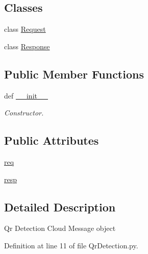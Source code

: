 \subsection*{Classes}
\begin{DoxyCompactItemize}
\item 
class \hyperlink{classRappCloud_1_1CloudMsgs_1_1QrDetection_1_1QrDetection_1_1Request}{Request}
\item 
class \hyperlink{classRappCloud_1_1CloudMsgs_1_1QrDetection_1_1QrDetection_1_1Response}{Response}
\end{DoxyCompactItemize}
\subsection*{Public Member Functions}
\begin{DoxyCompactItemize}
\item 
def \hyperlink{classRappCloud_1_1CloudMsgs_1_1QrDetection_1_1QrDetection_a7beb75864106fa5f9a0bc6785298bf37}{\-\_\-\-\_\-init\-\_\-\-\_\-}
\begin{DoxyCompactList}\small\item\em Constructor. \end{DoxyCompactList}\end{DoxyCompactItemize}
\subsection*{Public Attributes}
\begin{DoxyCompactItemize}
\item 
\hyperlink{classRappCloud_1_1CloudMsgs_1_1QrDetection_1_1QrDetection_a76408f8a0bc16629e997cad972c18515}{req}
\item 
\hyperlink{classRappCloud_1_1CloudMsgs_1_1QrDetection_1_1QrDetection_ac7cd07b0620c8a9306e1e40f6ed359f8}{resp}
\end{DoxyCompactItemize}


\subsection{Detailed Description}
\begin{DoxyVerb}Qr Detection Cloud Message object\end{DoxyVerb}
 

Definition at line 11 of file Qr\-Detection.\-py.



